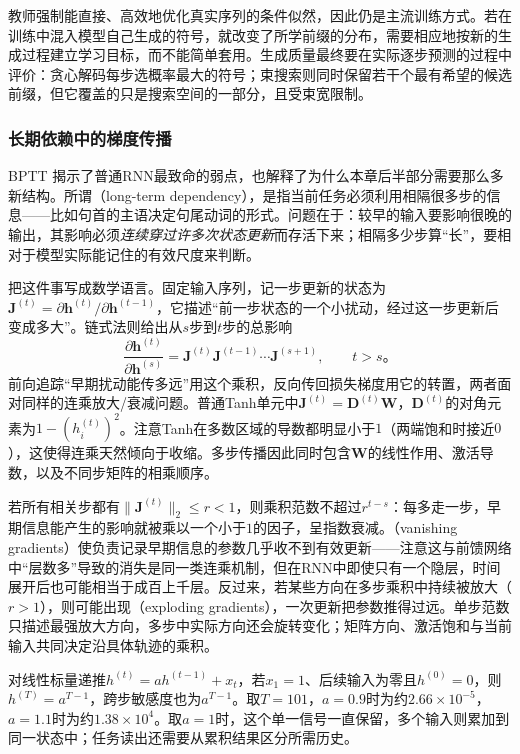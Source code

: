 教师强制能直接、高效地优化真实序列的条件似然，因此仍是主流训练方式。若在训练中混入模型自己生成的符号，就改变了所学前缀的分布，需要相应地按新的生成过程建立学习目标，而不能简单套用。生成质量最终要在实际逐步预测的过程中评价：贪心解码每步选概率最大的符号；束搜索则同时保留若干个最有希望的候选前缀，但它覆盖的只是搜索空间的一部分，且受束宽限制。

\subsubsection{长期依赖中的梯度传播}
\label{sec:rnn-long-dependencies}

BPTT 揭示了普通RNN最致命的弱点，也解释了为什么本章后半部分需要那么多新结构。所谓（long-term dependency），是指当前任务必须利用相隔很多步的信息——比如句首的主语决定句尾动词的形式。问题在于：较早的输入要影响很晚的输出，其影响必须\emph{连续穿过许多次状态更新}而存活下来；相隔多少步算“长”，要相对于模型实际能记住的有效尺度来判断。

把这件事写成数学语言。固定输入序列，记一步更新的状态为$\bm{J}^{(t)}=\partial\bm{h}^{(t)}/\partial\bm{h}^{(t-1)}$，它描述“前一步状态的一个小扰动，经过这一步更新后变成多大”。链式法则给出从$s$步到$t$步的总影响
\begin{equation}
  \frac{\partial\bm{h}^{(t)}}{\partial\bm{h}^{(s)}}
    =\bm{J}^{(t)}\bm{J}^{(t-1)}\cdots\bm{J}^{(s+1)},
    \qquad t>s\text{。}
  \label{eq:rnn-jacobian-product}
\end{equation}
前向追踪“早期扰动能传多远”用这个乘积，反向传回损失梯度用它的转置，两者面对同样的连乘放大/衰减问题。普通Tanh单元中$\bm{J}^{(t)}=\bm{D}^{(t)}\bm{W}$，$\bm{D}^{(t)}$的对角元素为$1-(h_i^{(t)})^2$。注意Tanh在多数区域的导数都明显小于$1$（两端饱和时接近$0$），这使得连乘天然倾向于收缩。多步传播因此同时包含$\bm{W}$的线性作用、激活导数，以及不同步矩阵的相乘顺序。

若所有相关步都有$\lVert\bm{J}^{(t)}\rVert_2\leq r<1$，则乘积范数不超过$r^{t-s}$：每多走一步，早期信息能产生的影响就被乘以一个小于$1$的因子，呈指数衰减。（vanishing gradients）使负责记录早期信息的参数几乎收不到有效更新——注意这与前馈网络中“层数多”导致的消失是同一类连乘机制，但在RNN中即使只有一个隐层，时间展开后也可能相当于成百上千层。反过来，若某些方向在多步乘积中持续被放大（$r>1$），则可能出现（exploding gradients），一次更新把参数推得过远。单步范数只描述最强放大方向，多步中实际方向还会旋转变化；矩阵方向、激活饱和与当前输入共同决定沿具体轨迹的乘积。

\begin{example}[传播距离与状态保留]
  \label{ex:rnn-memory-decay}
  对线性标量递推$h^{(t)}=a h^{(t-1)}+x_t$，若$x_1=1$、后续输入为零且$h^{(0)}=0$，则$h^{(T)}=a^{T-1}$，跨步敏感度也为$a^{T-1}$。取$T=101$，$a=0.9$时为约$2.66\times10^{-5}$，$a=1.1$时为约$1.38\times10^4$。取$a=1$时，这个单一信号一直保留，多个输入则累加到同一状态中；任务读出还需要从累积结果区分所需历史。
\end{example}

